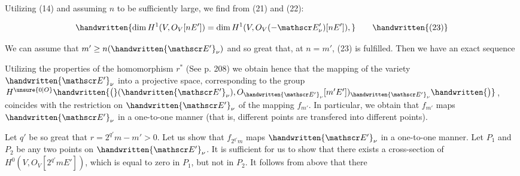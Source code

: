 
Utilizing (14) and assuming $n$ to be sufficiently
large, we find from (21) and (22):

\[
\handwritten{\dim H^1(V,O_V[nE'])=\dim H^1(V,O_V(-\mathscr E'_\nu)[nE']),}\tag*{\handwritten{(23)}}
\]

We can assume that $m'\geq n(\handwritten{\mathscr E'}_\nu)$ and so great that,
at $n=m'$, (23) is fulfilled. Then we have an exact
sequence


Utilizing the properties of the homomorphism
$r^*$ (See p. 208) we obtain hence that the mapping of the
variety $\handwritten{\mathscr E'}_\nu$ into a projective space, corresponding to
the group $H^{\unsure{0|O}}\handwritten{\big(}(\handwritten{\mathscr E'}_\nu),O_{\handwritten{\mathscr E'}_\nu}[m'E'])_{\handwritten{\mathscr E'}_\nu}\handwritten{\big)}$, coincides with the
restriction on $\handwritten{\mathscr E'}_\nu$ of the mapping $f_{m'}$. In particular,
we obtain that $f_{m'}$ maps $\handwritten{\mathscr E'}_\nu$ in a one-to-one manner
(that is, different points are transfered into different
points).

Let $q'$ be so great that $r=2^{q'}m-m'>0$. Let
us show that $f_{2^{q'}m}$ maps $\handwritten{\mathscr E'}_\nu$ in a one-to-one manner.
Let $P_1$ and $P_2$ be any two points on $\handwritten{\mathscr E'}_\nu$. It is
sufficient for us to show that there exists a cross-section of $H^0(V,O_V[2^{q'}mE'])$, which is equal to zero
in $P_1$, but not in $P_2$. It follows from above that there

